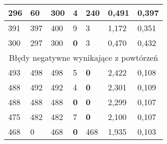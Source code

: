 \documentclass[a4paper]{article}
\begin{document}
\begin{table}[H]
\begin{tabular}{|p{1.6cm}|p{1.6cm}|p{1.6cm}|p{1.6cm}|p{1.6cm}|p{1.6cm}|p{1.6cm}|}
296 & 60 & 300 & 4 & 240 & 0,491 & 0,397 \\ \hline
391 & 397 & 400 & 9 & 3 & 1,172 & 0,351 \\ \hline
300 & 297 & 300 & \textbf{0} & 3 & 0,470 & 0,432 \\ \hline
\multicolumn{7}{|c|}{Błędy negatywne wynikające z powtórzeń} \\ \hline
493 & 498 & 498 & 5 & \textbf{0} & 2,422 & 0,108 \\ \hline
488 & 492 & 492 & 4 & \textbf{0} & 2,301 & 0,109 \\ \hline
488 & 488 & 488 & \textbf{0} & \textbf{0} & 2,299 & 0,107 \\ \hline
475 & 482 & 482 & 7 & \textbf{0} & 2,100 & 0,107 \\ \hline
468 & 0 & 468 & \textbf{0} & 468 & 1,935 & 0,103 \\ \hline
\end{tabular}
\label{}
\end{table}
\end{document}
